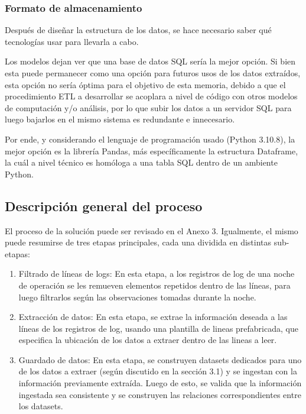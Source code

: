 \subsubsection{Formato de almacenamiento}

Después de diseñar la estructura de los datos, se hace necesario saber qué tecnologías usar para llevarla a cabo.

Los modelos dejan ver que una base de datos SQL sería la mejor opción. Si bien esta puede permanecer como una opción para futuros usos de los datos extraídos, esta opción no sería óptima para el objetivo de esta memoria, debido a que el procedimiento ETL a desarrollar se acoplara a nivel de código con otros modelos de computación y/o análisis, por lo que subir los datos a un servidor SQL para luego bajarlos en el mismo sistema es redundante e innecesario.

Por ende, y considerando el lenguaje de programación usado (Python 3.10.8), la mejor opción es la librería Pandas, más específicamente la estructura Dataframe, la cuál a nivel técnico es homóloga a una tabla SQL dentro de un ambiente Python.

\subsection{Descripción general del proceso}

El proceso de la solución puede ser revisado en el Anexo 3. Igualmente, el mismo puede resumirse de tres etapas principales, cada una dividida en distintas sub-etapas: 

\begin{enumerate}
    \item Filtrado de líneas de logs:
    En esta etapa, a los registros de log de una noche de operación se les remueven elementos repetidos dentro de las líneas, para luego filtrarlos según las observaciones tomadas durante la noche.

    \item Extracción de datos:
    En esta etapa, se extrae la información deseada a las líneas de los registros de log, usando una plantilla de lineas prefabricada, que especifica la ubicación de los datos a extraer dentro de las lineas a leer.

    \item Guardado de datos:
    En esta etapa, se construyen datasets dedicados para uno de los datos a extraer (según discutido en la sección 3.1)  y se ingestan con la información previamente extraída. Luego de esto, se valida que la información ingestada sea consistente y se construyen las relaciones correspondientes entre los datasets.
\end{enumerate}

